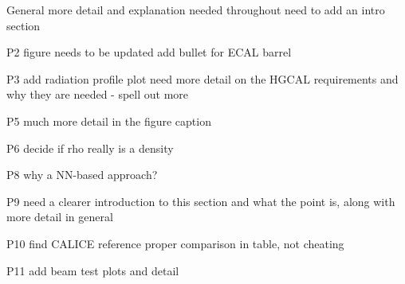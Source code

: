 General
more detail and explanation needed throughout
need to add an intro section

P2
figure needs to be updated
add bullet for ECAL barrel

P3 
add radiation profile plot
need more detail on the HGCAL requirements and why they are needed - spell out more

P5
much more detail in the figure caption

P6
decide if rho really is a density

P8 
why a NN-based approach?

P9 
need a clearer introduction to this section and what the point is, along with more detail in general 

P10
find CALICE reference
proper comparison in table, not cheating

P11 
add beam test plots and detail
